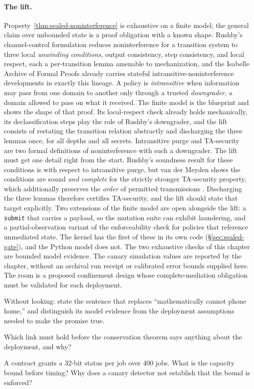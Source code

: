 \documentclass[11pt,a4paper]{article}
\theoremstyle{definition}
\begin{document}
\paragraph{The lift.}
Property~\ref{thm:sealed-noninterference} is exhaustive on a finite model; the
general claim over unbounded state is a proof obligation with a known shape.
Rushby's channel-control formulation  reduces noninterference for
a transition system to three local \emph{unwinding conditions}, output
consistency, step consistency, and local respect, each a per-transition lemma
amenable to mechanization, and the Isabelle Archive of Formal Proofs already
carries stateful intransitive-noninterference developments in exactly this
lineage. A policy is \emph{intransitive} when information may pass from one
domain to another only through a trusted \emph{downgrader}, a domain allowed
to pass on what it received. The finite model is the blueprint and shows the shape of that proof. Its local-respect check already
holds mechanically, its declassification steps play the role of Rushby's
downgrader, and the lift consists of restating the
transition relation abstractly and discharging the three lemmas once, for all
depths and all secrets. Intransitive purge and TA-security are two formal
definitions of noninterference with such a downgrader. The lift must get one detail right from the start.
Rushby's soundness result for these conditions is with respect to intransitive
purge, but van der Meyden shows the conditions are sound \emph{and complete}
for the strictly stronger TA-security property, which additionally preserves
the \emph{order} of permitted transmissions . Discharging the
three lemmas therefore certifies TA-security, and the lift should state that
target explicitly. Two extensions of the finite model are open alongside the
lift: a \texttt{submit} that carries a payload, so the mutation suite can
exhibit laundering, and a partial-observation variant of the enforceability
check for policies that reference unmediated state. The kernel has the
first of these in its own code (\S\ref{sec:sealed-gate}), and the Python
model does not. The two exhaustive checks
of this chapter are bounded model evidence. The canary simulation values are
reported by the chapter, without an archival run receipt or calibrated error
bounds supplied here. The room is a proposed confinement design whose
complete-mediation obligation must be validated for each deployment.

\begin{pdrecitation}
\item Without looking: state the sentence that replaces ``mathematically cannot
  phone home,'' and distinguish its model evidence from the deployment assumptions needed
  to make the promise true.
\item Which link must hold before the conservation theorem says anything about
  the deployment, and why?
\item A contract grants a 32-bit status per job over 400 jobs. What is the
  capacity bound before timing? Why does a canary detector not establish
  that the bound is enforced?
\end{pdrecitation}
\end{document}

